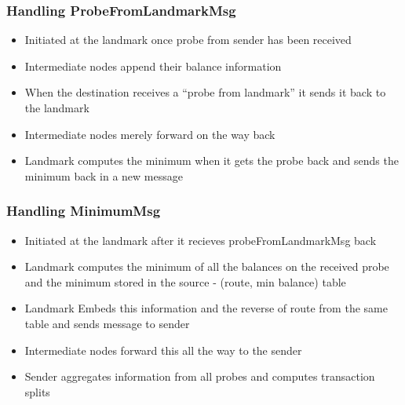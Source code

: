 \documentclass[a4paper]{article}
\begin{document}
\subsubsection{Handling ProbeFromLandmarkMsg}
                \begin{itemize}
                    \item Initiated at the landmark once probe from sender has been received
                    \item Intermediate nodes append their balance information
                    \item When the destination receives a ``probe from landmark'' it sends 
                        it back to the landmark
                    \item Intermediate nodes merely forward on the way back
                    \item Landmark computes the minimum when it gets the probe back and 
                        sends the minimum back in a new message
                \end{itemize}

\subsubsection{Handling MinimumMsg}
                \begin{itemize}
                    \item Initiated at the landmark after it recieves probeFromLandmarkMsg back
                    \item Landmark computes the minimum of all the 
                        balances on the received probe and the minimum stored
                        in the source - (route, min balance) table
                    \item Landmark Embeds this information and the reverse of route from the same table and 
                        sends message to sender
                    \item Intermediate nodes forward this all the way to the sender
                    \item Sender aggregates information from all probes and computes transaction splits
                \end{itemize}
\end{document}
